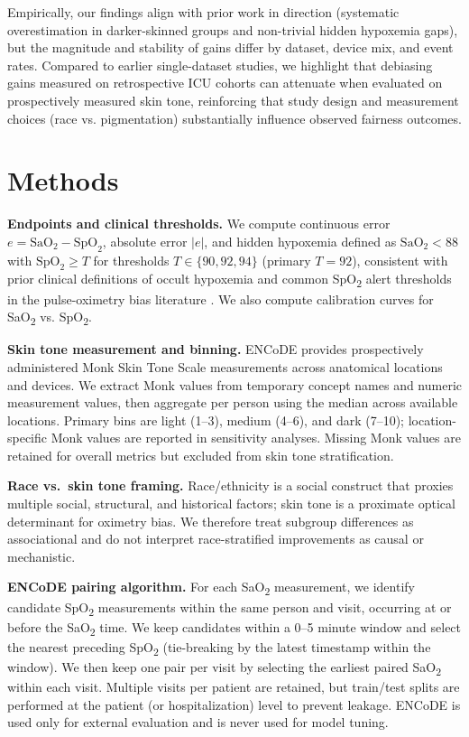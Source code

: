 \documentclass[pmlr]{jmlr}%
\begin{document}
Empirically, our findings align with prior work in direction (systematic overestimation in darker-skinned groups and non-trivial hidden hypoxemia gaps), but the magnitude and stability of gains differ by dataset, device mix, and event rates. Compared to earlier single-dataset studies, we highlight that debiasing gains measured on retrospective ICU cohorts can attenuate when evaluated on prospectively measured skin tone, reinforcing that study design and measurement choices (race vs. pigmentation) substantially influence observed fairness outcomes.

\section{Methods}

\textbf{Endpoints and clinical thresholds.} We compute continuous error $e = \text{SaO}_2 - \text{SpO}_2$, absolute error $|e|$, and hidden hypoxemia defined as $\text{SaO}_2 < 88$ with $\text{SpO}_2 \geq T$ for thresholds $T \in \{90,92,94\}$ (primary $T=92$), consistent with prior clinical definitions of occult hypoxemia and common SpO\textsubscript{2} alert thresholds in the pulse-oximetry bias literature \cite{sjoding2020racial,wong2021discrepancies}. We also compute calibration curves for SaO\textsubscript{2} vs. SpO\textsubscript{2}.

\textbf{Skin tone measurement and binning.} ENCoDE provides prospectively administered Monk Skin Tone Scale measurements across anatomical locations and devices. We extract Monk values from temporary concept names and numeric measurement values, then aggregate per person using the median across available locations. Primary bins are light (1--3), medium (4--6), and dark (7--10); location-specific Monk values are reported in sensitivity analyses. Missing Monk values are retained for overall metrics but excluded from skin tone stratification.

\textbf{Race vs.\ skin tone framing.} Race/ethnicity is a social construct that proxies multiple social, structural, and historical factors; skin tone is a proximate optical determinant for oximetry bias. We therefore treat subgroup differences as associational and do not interpret race-stratified improvements as causal or mechanistic.

\textbf{ENCoDE pairing algorithm.} For each SaO\textsubscript{2} measurement, we identify candidate SpO\textsubscript{2} measurements within the same person and visit, occurring at or before the SaO\textsubscript{2} time. We keep candidates within a 0--5 minute window and select the nearest preceding SpO\textsubscript{2} (tie-breaking by the latest timestamp within the window). We then keep one pair per visit by selecting the earliest paired SaO\textsubscript{2} within each visit. Multiple visits per patient are retained, but train/test splits are performed at the patient (or hospitalization) level to prevent leakage. ENCoDE is used only for external evaluation and is never used for model tuning.
\end{document}

